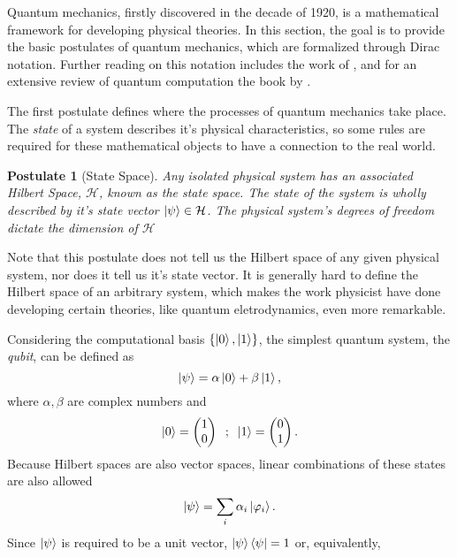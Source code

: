 \documentclass[../../dissertation.tex]{subfiles}
\newtheorem{post}{Postulate}
\begin{document}
Quantum mechanics, firstly discovered in the decade of 1920, is a mathematical
framework for developing physical theories. In this section, the goal is to
provide the basic postulates of quantum mechanics, which are formalized through
Dirac notation. Further reading on this notation includes the work of
\cite{sakurai1994}, and for an extensive review of quantum computation the
book by \cite{nielsen2011}.\par  
The first postulate defines where the processes of quantum mechanics take
place. The \textit{state} of a system describes it's physical characteristics,
so some rules are required for these mathematical objects to have a connection
to the real world.
\begin{post}[State Space] 
	Any isolated physical system has an associated Hilbert Space,
	$\mathcal{H}$, known as the state space. The state of the system is
	wholly described by it's state vector $\ket{\psi} \in \mathcal{H}$. The
	physical system's degrees of freedom dictate the dimension of
	$\mathcal{H}$
\end{post}
Note that this postulate does not tell us the Hilbert space of any given
physical system, nor does it tell us it's state vector. It is generally hard to
define the Hilbert space of an arbitrary system, which makes the work physicist
have done developing certain theories, like quantum eletrodynamics, even more
remarkable.\par 
Considering the computational basis $\{\ket{0},\ket{1}\}$, the simplest quantum
system, the \textit{qubit}, can be defined as 
\begin{equation}
	\ket{\psi} = \alpha \ket{0} + \beta \ket{1},
\end{equation}
where $\alpha,\beta$ are complex numbers and
\begin{equation}
	\ket{0} = \begin{pmatrix} 1 \\0 \end{pmatrix}  \; \; ;  \;  \;  \ket{1} = \begin{pmatrix} 0 \\1 \end{pmatrix}.
\end{equation}
Because Hilbert spaces are also vector spaces, linear combinations of these
states are also allowed 
\begin{equation}
	\ket{\psi} = \sum_i \alpha_i \ket{\varphi_i}.
\end{equation}
Since $\ket{\psi}$ is required to be a unit vector, $\ket{\psi}\bra{\psi}=1$ or, equivalently,
\end{document}
